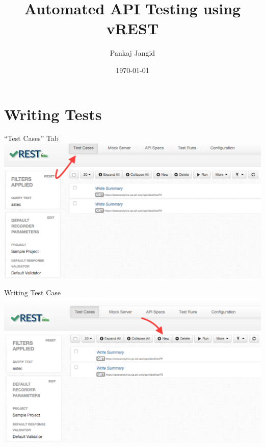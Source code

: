 \documentclass{beamer}
\title[Automated API Testing using vREST]{Automated API Testing using vREST}
\author{Pankaj Jangid}
\institute{Optimizory Technologies Pvt. Ltd.}
\date{\today}
\begin{document}
\begin{frame}[plain,c]
\titlepage
\end{frame}


\section{Writing Tests}
\begin{frame}{``Test Cases'' Tab}
    \includegraphics[scale=0.30]{images/test_cases_tab.PNG}
\end{frame}
\begin{frame}{Writing Test Case}
    \includegraphics[scale=0.30]{images/new_test_case_button.PNG}
\end{frame}
\end{document}
